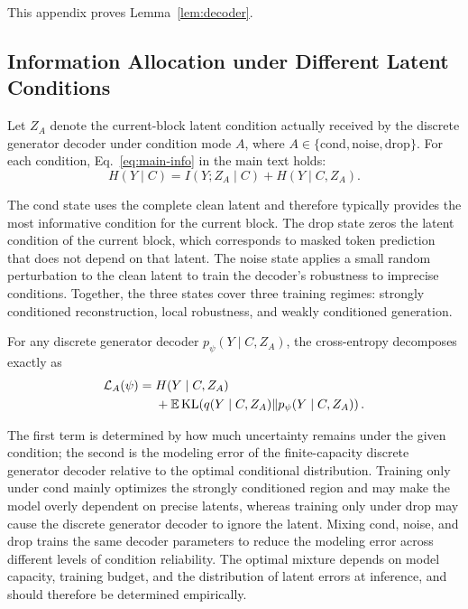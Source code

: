 This appendix proves Lemma~\ref{lem:decoder}.

\subsection{Information Allocation under Different Latent Conditions}

Let $Z_A$ denote the current-block latent condition actually received by the discrete generator decoder under condition mode $A$, where $A\in\{\mathrm{cond},\mathrm{noise},\mathrm{drop}\}$. For each condition, Eq.~\eqref{eq:main-info} in the main text holds:
\begin{equation}
    H(Y\mid C)
    =
    I(Y;Z_A\mid C)
    +
    H(Y\mid C,Z_A).
    \label{eq:app-decoder-info}
\end{equation}

The \textsf{cond} state uses the complete clean latent and therefore typically provides the most informative condition for the current block. The \textsf{drop} state zeros the latent condition of the current block, which corresponds to masked token prediction that does not depend on that latent. The \textsf{noise} state applies a small random perturbation to the clean latent to train the decoder's robustness to imprecise conditions. Together, the three states cover three training regimes: strongly conditioned reconstruction, local robustness, and weakly conditioned generation.

For any discrete generator decoder $p_\psi(Y\mid C,Z_A)$, the cross-entropy decomposes exactly as
\begin{equation}
\begin{aligned}
    \mathcal{L}_A(\psi)
    ={}&H(Y\mid C,Z_A)\\
    &+\mathbb{E}\operatorname{KL}\!\left(
      q(Y\mid C,Z_A)
      \|p_\psi(Y\mid C,Z_A)
    \right).
\end{aligned}
\label{eq:app-mode-ce}
\end{equation}

The first term is determined by how much uncertainty remains under the given condition; the second is the modeling error of the finite-capacity discrete generator decoder relative to the optimal conditional distribution. Training only under \textsf{cond} mainly optimizes the strongly conditioned region and may make the model overly dependent on precise latents, whereas training only under \textsf{drop} may cause the discrete generator decoder to ignore the latent. Mixing \textsf{cond}, \textsf{noise}, and \textsf{drop} trains the same decoder parameters to reduce the modeling error across different levels of condition reliability. The optimal mixture depends on model capacity, training budget, and the distribution of latent errors at inference, and should therefore be determined empirically.

